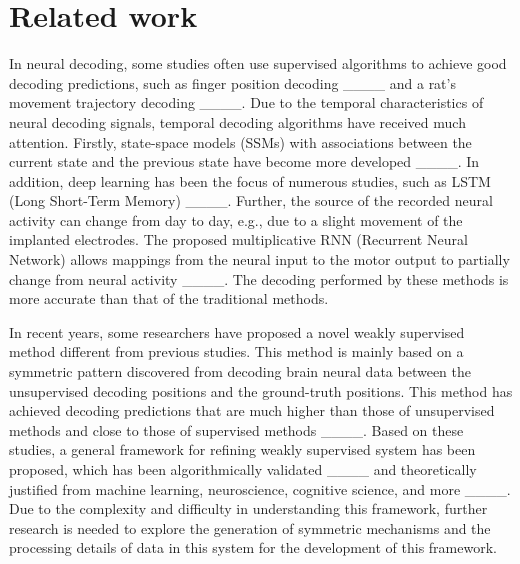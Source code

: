 \section{Related work}
In neural decoding, some studies often use supervised algorithms to achieve good decoding predictions, such as finger position decoding ____ and a rat's movement trajectory decoding ____. Due to the temporal characteristics of neural decoding signals, temporal decoding algorithms have received much attention. Firstly, state-space models (SSMs) with associations between the current state and the previous state have become more developed ____. 
In addition, deep learning has been the focus of numerous studies, such as LSTM (Long Short-Term Memory) ____. Further, the source of the recorded neural activity can change from day to day, e.g., due to a slight movement of the implanted electrodes. The proposed multiplicative RNN (Recurrent Neural Network) allows mappings from the neural input to the motor output to partially change from neural activity ____. The decoding performed by these methods is more accurate than that of the traditional methods. 

In recent years, some researchers have proposed a novel weakly supervised method different from previous studies. This method is mainly based on a symmetric pattern discovered from decoding brain neural data between the unsupervised decoding positions and the ground-truth positions. This method has achieved decoding predictions that are much higher than those of unsupervised methods and close to those of supervised methods ____. Based on these studies, a general framework for refining weakly supervised system has been proposed, which has been algorithmically validated ____ and theoretically justified from machine learning, neuroscience, cognitive science, and more ____. Due to the complexity and difficulty in understanding this framework, further research is needed to explore the generation of symmetric mechanisms and the processing details of data in this system for the development of this framework.